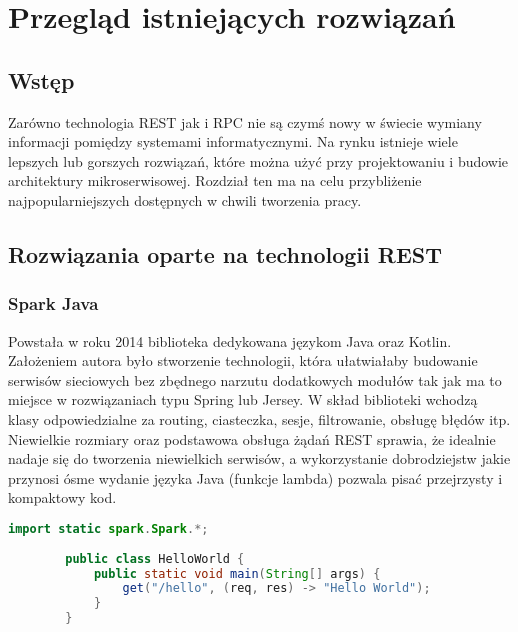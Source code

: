 \chapter{Przegląd istniejących rozwiązań}
\section{Wstęp}
Zarówno technologia REST jak i RPC nie są czymś nowy w świecie wymiany informacji pomiędzy systemami informatycznymi. Na rynku istnieje wiele lepszych lub gorszych rozwiązań, które można użyć przy projektowaniu i budowie architektury mikroserwisowej. Rozdział ten ma na celu przybliżenie najpopularniejszych dostępnych w chwili tworzenia pracy.
\section{Rozwiązania oparte na technologii REST}
\subsection{Spark Java}
Powstała w roku 2014 biblioteka dedykowana językom Java oraz Kotlin. Założeniem autora było stworzenie technologii, która ułatwiałaby budowanie serwisów sieciowych bez zbędnego narzutu dodatkowych modułów tak jak ma to miejsce w rozwiązaniach typu Spring lub Jersey. W skład biblioteki wchodzą klasy odpowiedzialne za routing, ciasteczka, sesje, filtrowanie, obsługę błędów itp. Niewielkie rozmiary oraz podstawowa obsługa żądań REST sprawia, że idealnie nadaje się do tworzenia niewielkich serwisów, a wykorzystanie dobrodziejstw jakie przynosi ósme wydanie języka Java (funkcje lambda) pozwala pisać przejrzysty i kompaktowy kod.
\begin{lstlisting}[language=Java, caption=Przykład metody zwracającej tekst w Spark Java]
        import static spark.Spark.*;
        
        public class HelloWorld {
            public static void main(String[] args) {
                get("/hello", (req, res) -> "Hello World");
            } 
        }
        \end{lstlisting}
